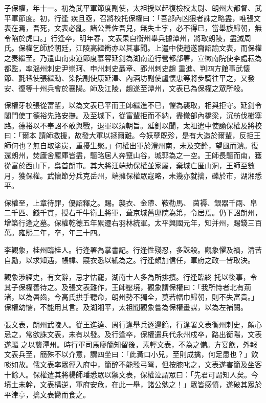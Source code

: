 \begin{pinyinscope}
 子保權，年十一。初為武平軍節度副使，太祖授以起復檢校太尉、朗州大都督、武平軍節度。初，行逢
 疾且亟，召將校托保權曰：「吾部內凶狠者誅之略盡，唯張文表在焉，吾死，文表必亂。諸公善佐吾兒，無失土宇，必不得已，當舉族歸朝，無令陷於虎口。」行逢卒，明年春，文表果自衡州舉兵據潭州，將取朗陵，盡滅周氏。保權乞師於朝廷，江陵高繼衝亦以其事聞。上遣中使趙遂齎詔諭文表，而保權之奏繼至。乃遣山南東道節度慕容延釗為湖南道行營都部署，宣徽南院使李處耘為都監，率淄州刺史尹崇珂、申州刺史聶章、郢州刺史趙
 重進、判四方館事武懷節、氈毯使張繼勳、染院副使康延澤、內酒坊副使盧懷忠等將步騎往平之，又發安、復等十州兵會於襄陽。師及江陵，趙遂至潭州，文表已為保權之眾所殺。



 保權牙校張從富輩，以為文表已平而王師繼進不已，懼為襲取，相與拒守。延釗令閣門使丁德裕先路安撫。及至城下，從富輩拒而不納，盡撤部內橋梁，沉舫伐樹塞路。德裕以不奉詔不敢與戰，退軍以須朝旨。延釗以聞，太祖遣中使諭保權及將校曰：「爾本
 請師救援，故發大軍以拯爾難。今妖孽既殄，是有大造於爾輩，反拒王師何也？無自取塗炭，重擾生聚。」何權出軍於澧州南，未及交鋒，望風而潰。復還朗州，焚廬舍廩庫皆盡，驅略居人奔竄山谷，城郭為之一空。王師長驅而南，獲從富於西山下，梟首朗市。其大將汪端劫保權並家屬，棄城亡匿山洞，王師至數月，獲保權。武懷節分兵克岳州，端擁保權眾寇略，未幾亦就擒，礫於市，湖湘悉平。



 保權至，上章待罪，優詔釋之。賜。襲衣、金帶、鞍勒馬、
 茵褥、銀器千兩、帛二千匹、錢千貫，授右千牛衛上將軍，葺京城舊邸院為第，令居焉。仍下詔朗州，增築行逢之墓。保權乾德五年累遷右羽林統軍。太平興國元年，知并州，賜錢三百萬。雍熙二年，卒，年三十四。



 李觀象，桂州臨桂人。行逢署為掌書記。行逢性殘忍，多誅殺。觀象懼及禍，清苦自勵，以求知遇，帳幃、寢衣悉以紙為之。行逢頗加信任，軍府之政一皆取決。



 觀象涉經史，有文辭，忌才怙寵，湖南士人多為所排擯。行逢臨終
 托以後事，令其子保權善待之。及張文表難作，王師壓境，觀象謂保權曰：「我所恃者北有荊渚，以為唇齒，今高氏拱手聽命，朗州勢不獨全，莫若幅巾歸朝，則不失富貴。」保權幼懦，不能用其言。及湖湘平，太祖聞觀象嘗為保權畫謀，以為左補闕。



 張文表，朗州武陵人。從王進逵、周行逢舉兵逐邊鎬，行逢署文表衡州刺史，頗心忌之，常欲誅文表，未有以發。及行逢卒，保權遣兵代永州戍卒，路出衡陽，文表遂驅
 之以襲潭州。時行軍司馬廖簡知留後，素輕文表，不為之備。方宴飲，外報文表兵至，簡殊不以介意，謂四坐曰：「此黃口小兒，至則成擒，何足患也？」飲啖如故。俄文表率眾徑入府中，簡醉不能彀弓弩，但按膝叱之，文表遂害簡及坐客十餘人。保權遣其將楊師璠悉眾以禦文表，保權泣謂眾曰：「先君可謂知人矣。今墳土未幹，文表構逆，軍府安危，在此一舉，諸公勉之！」眾皆感憤，遂破其眾於平津亭，擒文表臠而食之。




\end{pinyinscope}

